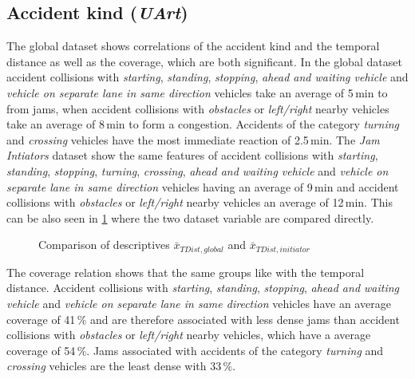 \subsection{Accident kind (\textit{UArt})}
\label{analysis_sum_UArt}
The global dataset shows correlations of the accident kind and the temporal distance as well as the coverage, which are both significant. In the global dataset accident collisions with \textit{starting}, \textit{standing}, \textit{stopping}, \textit{ahead and waiting vehicle} and \textit{vehicle on separate lane in same direction} vehicles take an average of 5\,min to from jams, when accident collisions with \textit{obstacles} or \textit{left/right} nearby vehicles take an average of 8\,min to form a congestion. Accidents of the category \textit{turning} and \textit{crossing} vehicles have the most immediate reaction of 2.5\,min. The \textit{Jam Intiators} dataset show the same features of accident collisions with \textit{starting}, \textit{standing}, \textit{stopping}, \textit{turning}, \textit{crossing}, \textit{ahead and waiting vehicle} and \textit{vehicle on separate lane in same direction} vehicles having an average of 9\,min and accident collisions with \textit{obstacles} or \textit{left/right} nearby vehicles an average of 12\,min. This can be also seen in \cref{fig:baysis_summary_UArt1_TDist_barplot} where the two dataset variable are compared directly.
\begin{figure}[ht!]
    \data
    \pgfplotstablesort[sort key=means, sort cmp=float >]{\datasorted}{\data}
    \tiny
    \centering
    \caption{Comparison of descriptives $\bar{x}_{TDist,global}$ and $\bar{x}_{TDist,initiator}$}
    \label{fig:baysis_summary_UArt1_TDist_barplot}
\end{figure}
The coverage relation shows that the same groups like with the temporal distance. Accident collisions with \textit{starting}, \textit{standing}, \textit{stopping}, \textit{ahead and waiting vehicle} and \textit{vehicle on separate lane in same direction} vehicles have an average coverage of 41\,\% and are therefore associated with less dense jams than accident collisions with \textit{obstacles} or \textit{left/right} nearby vehicles, which have a average coverage of 54\,\%. Jams associated with accidents of the category \textit{turning} and \textit{crossing} vehicles are the least dense with 33\,\%.


